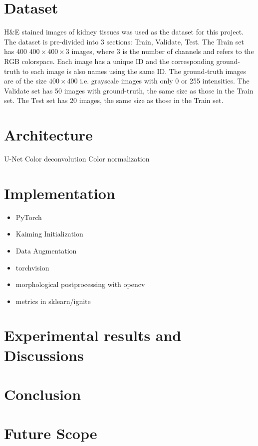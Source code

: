 \documentclass[11pt]{article}
\theoremstyle{definition}
\begin{document}
  \section{Dataset}
    H\&E stained images of kidney tissues was used as the dataset for this project.\\
    The dataset is pre-divided into 3 sections: Train, Validate, Test.
    The Train set has 400 $400\times400\times3$ images, where 3 is the number of channels and refers to the RGB colorspace. 
    Each image has a unique ID and the corresponding ground-truth to each image is also names using the same ID. 
    The ground-truth images are of the size $400\times400$ i.e. grayscale images with only 0 or 255 intensities. 
    The Validate set has 50 images with ground-truth, the same size as those in the Train set.
    The Test set has 20 images, the same size as those in the Train set.

  \section{Architecture}
    U-Net\cite{Ronneberger2015UNetCN}
    Color deconvolution\cite{Ruifrok2001QuantificationOH}
    Color normalization

  \section{Implementation}
    \begin{itemize}
      \item PyTorch \cite{paszke2017automatic}
      \item Kaiming Initialization
      \item Data Augmentation
      \item torchvision
      \item morphological postprocessing with opencv
      \item metrics in sklearn/ignite
    \end{itemize}
  \section{Experimental results and Discussions}
  \section{Conclusion}
  \section{Future Scope}
   
  \newpage
  
  
  \medskip
\end{document}
